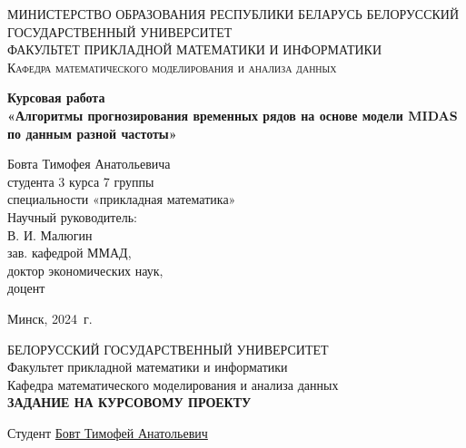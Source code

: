 \documentclass[a4paper, 12pt]{extarticle}
\numberwithin{equation}{subsection}
\begin{document}
	\def\contentsname{ОГЛАВЛЕНИЕ}
	
	\begin{titlepage}
		\begin{center}
			\textsc{МИНИСТЕРСТВО ОБРАЗОВАНИЯ РЕСПУБЛИКИ БЕЛАРУСЬ БЕЛОРУССКИЙ ГОСУДАРСТВЕННЫЙ УНИВЕРСИТЕТ
				\\[5mm]
				ФАКУЛЬТЕТ ПРИКЛАДНОЙ МАТЕМАТИКИ И ИНФОРМАТИКИ\\[2mm]
				Кафедра математического моделирования и анализа данных
			}
			
			\vfill
			
			\textbf{Курсовая работа
				\\[3mm]
				«Алгоритмы прогнозирования временных рядов на основе модели MIDAS по данным разной частоты»
				\\[26mm]
			}
		\end{center}
		
		\hfill
		\begin{minipage}{.5\textwidth}
			\begin{flushright}
				Бовта Тимофея Анатольевича\\
				студента 3 курса 7 группы\\
				специальности «прикладная математика»\\[5mm]
				
				Научный руководитель:\\[2mm] 
				В. И. Малюгин\\
				зав. кафедрой ММАД,\\
				доктор экономических наук,\\
				доцент
			\end{flushright}
		\end{minipage}%
		\vfill
		\begin{center}
			Минск, 2024\ г.
		\end{center}
	\end{titlepage}
	\newpage
	\setcounter{page}{2}
	\begin{center}
		\large{БЕЛОРУССКИЙ ГОСУДАРСТВЕННЫЙ УНИВЕРСИТЕТ}
		\\[2mm]
		Факультет прикладной математики и информатики\\[5mm]
		Кафедра математического моделирования и анализа данных\\[5mm]
		\large{\textbf{ЗАДАНИЕ НА КУРСОВОМУ ПРОЕКТУ\\[20mm]}}
	\end{center}
	Студент \quad \underline{Бовт Тимофей Анатольевич\hspace*{\linegoal}}\\[2mm]
\end{document}
